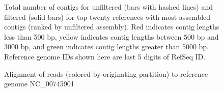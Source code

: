 \documentclass[11pt]{article} %
\begin{document}
\begin{figure}[ht]
\caption{Total number of contigs for unfiltered (bars with hashed
  lines) and filtered (solid bars) for top twenty references with most
  assembled contigs (ranked by unfiltered assembly).  Red indicates
  contig lengths less than 500 bp, yellow indicates contig lengths
  between 500 bp and 3000 bp, and green indicates contig lengths
  greater than 5000 bp.  Reference genome IDs shown here are last 5
  digits of RefSeq ID.}
\label{contig-lengths}
\end{figure}

\begin{figure}[ht]
\caption{Alignment of reads (colored by originating partition) to
  reference genome NC\_00745901}
\label{diginormreference}
\end{figure}
\end{document}
